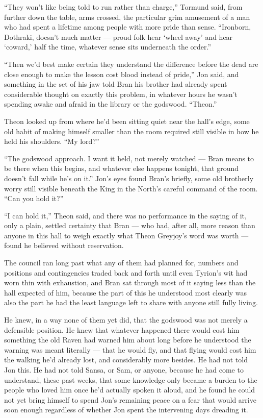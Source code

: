 “They won’t like being told to run rather than charge,” Tormund said, from further down the table, arms crossed, the particular grim amusement of a man who had spent a lifetime among people with more pride than sense. “Ironborn, Dothraki, doesn’t much matter — proud folk hear ‘wheel away’ and hear ‘coward,’ half the time, whatever sense sits underneath the order.”

“Then we’d best make certain they understand the difference before the dead are close enough to make the lesson cost blood instead of pride,” Jon said, and something in the set of his jaw told Bran his brother had already spent considerable thought on exactly this problem, in whatever hours he wasn’t spending awake and afraid in the library or the godswood. “Theon.”

Theon looked up from where he’d been sitting quiet near the hall’s edge, some old habit of making himself smaller than the room required still visible in how he held his shoulders. “My lord?”

“The godswood approach. I want it held, not merely watched — Bran means to be there when this begins, and whatever else happens tonight, that ground doesn’t fall while he’s on it.” Jon’s eyes found Bran’s briefly, some old brotherly worry still visible beneath the King in the North’s careful command of the room. “Can you hold it?”

“I can hold it,” Theon said, and there was no performance in the saying of it, only a plain, settled certainty that Bran — who had, after all, more reason than anyone in this hall to weigh exactly what Theon Greyjoy’s word was worth — found he believed without reservation.

\sceneBreak

The council ran long past what any of them had planned for, numbers and positions and contingencies traded back and forth until even Tyrion’s wit had worn thin with exhaustion, and Bran sat through most of it saying less than the hall expected of him, because the part of this he understood most clearly was also the part he had the least language left to share with anyone still fully living.

He knew, in a way none of them yet did, that the godswood was not merely a defensible position. He knew that whatever happened there would cost him something the old Raven had warned him about long before he understood the warning was meant literally — that he would fly, and that flying would cost him the walking he’d already lost, and considerably more besides. He had not told Jon this. He had not told Sansa, or Sam, or anyone, because he had come to understand, these past weeks, that some knowledge only became a burden to the people who loved him once he’d actually spoken it aloud, and he found he could not yet bring himself to spend Jon’s remaining peace on a fear that would arrive soon enough regardless of whether Jon spent the intervening days dreading it.

